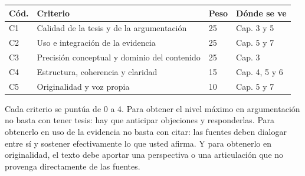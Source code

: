 \documentclass[12pt,a4paper,openany]{report}
\begin{document}
\begin{table}[htbp]
	\centering
	\small
	\begin{tabular}{C{1.2cm} L{7.6cm} C{1.8cm} L{2.8cm}}
		\toprule
		\textbf{C\'od.} & \textbf{Criterio} & \textbf{Peso} & \textbf{D\'onde se ve} \\
		\midrule
		C1 & Calidad de la tesis y de la argumentaci\'on & 25 & Cap. 3 y 5 \\
		C2 & Uso e integraci\'on de la evidencia & 25 & Cap. 5 y 7 \\
		C3 & Precisi\'on conceptual y dominio del contenido & 25 & Cap. 3 \\
		C4 & Estructura, coherencia y claridad & 15 & Cap. 4, 5 y 6 \\
		C5 & Originalidad y voz propia & 10 & Cap. 5 y 7 \\
		\bottomrule
	\end{tabular}
\end{table}

Cada criterio se punt\'ua de 0 a 4. Para obtener el nivel m\'aximo en argumentaci\'on no basta con tener tesis: hay que anticipar objeciones y responderlas. Para obtenerlo en uso de la evidencia no basta con citar: las fuentes deben dialogar entre s\'i y sostener efectivamente lo que usted afirma. Y para obtenerlo en originalidad, el texto debe aportar una perspectiva o una articulaci\'on que no provenga directamente de las fuentes.


\end{document}
